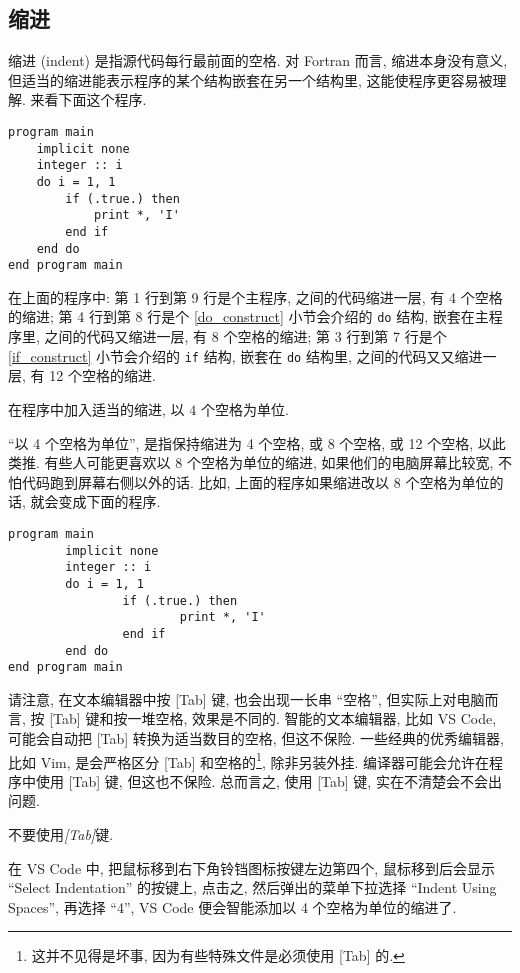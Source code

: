 \subsection{缩进}\label{indent}

缩进 (indent) 是指源代码每行最前面的空格. 对 Fortran 而言, 缩进本身没有意义, 但适当的缩进能表示程序的某个结构嵌套在另一个结构里, 这能使程序更容易被理解. 来看下面这个程序.
\begin{lstlisting}
program main
    implicit none
    integer :: i
    do i = 1, 1
        if (.true.) then
            print *, 'I'
        end if
    end do
end program main
\end{lstlisting}
在上面的程序中: 第 1 行到第 9 行是个主程序, 之间的代码缩进一层, 有 4 个空格的缩进; 第 4 行到第 8 行是个 \ref{do_construct} 小节会介绍的 \texttt{do} 结构, 嵌套在主程序里, 之间的代码又缩进一层, 有 8 个空格的缩进; 第 3 行到第 7 行是个 \ref{if_construct} 小节会介绍的 \texttt{if} 结构, 嵌套在 \texttt{do} 结构里, 之间的代码又又缩进一层, 有 12 个空格的缩进.
\begin{convention}
    在程序中加入适当的缩进, 以 $4$ 个空格为单位.\label{fortran_indent}
\end{convention}
``以 4 个空格为单位'', 是指保持缩进为 4 个空格, 或 8 个空格, 或 12 个空格, 以此类推. 有些人可能更喜欢以 8 个空格为单位的缩进, 如果他们的电脑屏幕比较宽, 不怕代码跑到屏幕右侧以外的话. 比如, 上面的程序如果缩进改以 8 个空格为单位的话, 就会变成下面的程序.
\begin{lstlisting}
program main
        implicit none
        integer :: i
        do i = 1, 1
                if (.true.) then
                        print *, 'I'
                end if
        end do
end program main
\end{lstlisting}

请注意, 在文本编辑器中按 [Tab] 键, 也会出现一长串 ``空格'', 但实际上对电脑而言, 按 [Tab] 键和按一堆空格, 效果是不同的. 智能的文本编辑器, 比如 VS Code, 可能会自动把 [Tab] 转换为适当数目的空格, 但这不保险. 一些经典的优秀编辑器, 比如 Vim, 是会严格区分 [Tab] 和空格的\footnote{
    这并不见得是坏事, 因为有些特殊文件是必须使用 [Tab] 的.
}, 除非另装外挂. 编译器可能会允许在程序中使用 [Tab] 键, 但这也不保险. 总而言之, 使用 [Tab] 键, 实在不清楚会不会出问题.
\begin{convention}
    不要使用\emph{[Tab]}键.
\end{convention}

在 VS Code 中, 把鼠标移到右下角铃铛图标按键左边第四个, 鼠标移到后会显示 ``Select Indentation'' 的按键上, 点击之, 然后弹出的菜单下拉选择 ``Indent Using Spaces'', 再选择 ``4'', VS Code 便会智能添加以 4 个空格为单位的缩进了.

